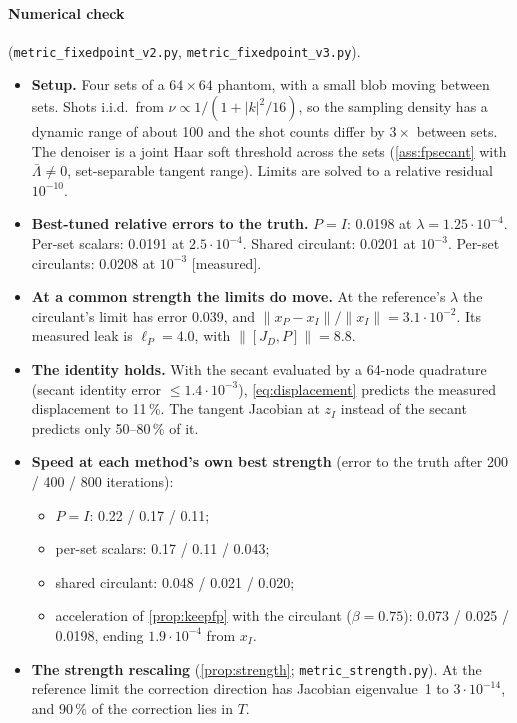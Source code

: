 \documentclass[11pt]{article}
\theoremstyle{definition}
\theoremstyle{remark}
\newcommand{\norm}[1]{\lVert #1\rVert}
\begin{document}
\paragraph{Numerical check} (\texttt{metric\_fixedpoint\_v2.py}, \texttt{metric\_fixedpoint\_v3.py}).
\begin{itemize}
\item \textbf{Setup.} Four sets of a $64\times64$ phantom, with a small blob moving between sets. Shots i.i.d.\ from
  $\nu\propto1/(1+|k|^2/16)$, so the sampling density has a dynamic range of about 100 and the shot counts differ by $3\times$ between sets. The denoiser is a joint Haar soft threshold across the sets (\cref{ass:fpsecant} with $\bar\Lambda\neq0$, set-separable tangent range). Limits are solved to a relative residual $10^{-10}$.
\item \textbf{Best-tuned relative errors to the truth.} $P=I$: 0.0198 at $\lambda=1.25\cdot10^{-4}$. Per-set scalars: 0.0191 at $2.5\cdot10^{-4}$. Shared circulant: 0.0201 at $10^{-3}$. Per-set circulants: 0.0208 at $10^{-3}$ [measured].
\item \textbf{At a common strength the limits do move.} At the reference's $\lambda$ the circulant's limit has error 0.039, and $\norm{x_P-x_I}/\norm{x_I}=3.1\cdot10^{-2}$. Its measured leak is $\ell_P=4.0$, with $\norm{[J_D,P]}=8.8$.
\item \textbf{The identity holds.} With the secant evaluated by a 64-node quadrature (secant identity error $\le1.4\cdot10^{-3}$), \eqref{eq:displacement} predicts the measured displacement to 11\,\%. The tangent Jacobian at $z_I$ instead of the secant predicts only 50--80\,\% of it.
\item \textbf{Speed at each method's own best strength} (error to the truth after 200 / 400 / 800 iterations):
  \begin{itemize}
  \item $P=I$: 0.22 / 0.17 / 0.11;
  \item per-set scalars: 0.17 / 0.11 / 0.043;
  \item shared circulant: 0.048 / 0.021 / 0.020;
  \item acceleration of \cref{prop:keepfp} with the circulant ($\beta=0.75$): 0.073 / 0.025 / 0.0198, ending $1.9\cdot10^{-4}$ from $x_I$.
  \end{itemize}
\item \textbf{The strength rescaling} (\cref{prop:strength}; \texttt{metric\_strength.py}). At the reference limit the correction direction has Jacobian eigenvalue~1 to $3\cdot10^{-14}$, and 90\,\% of the correction lies in $T$.

\end{itemize}
\end{document}
